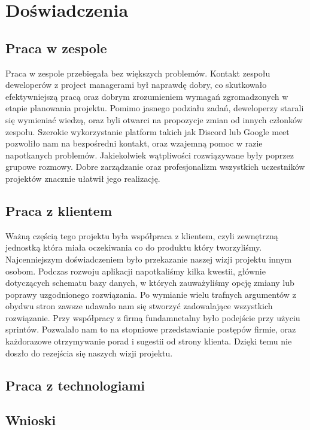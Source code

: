 \chapter{Doświadczenia}

\section{Praca w zespole}

Praca w zespole przebiegała bez większych problemów. Kontakt zespołu deweloperów z project managerami był naprawdę dobry, 
co skutkowało efektywniejszą pracą oraz dobrym zrozumieniem wymagań zgromadzonych w etapie planowania projektu. Pomimo jasnego
podziału zadań, deweloperzy starali się wymieniać wiedzą, oraz byli otwarci na propozycje zmian od innych członków 
zespołu. Szerokie wykorzystanie platform takich jak Discord lub Google meet pozwoliło nam na bezpośredni kontakt, 
oraz wzajemną pomoc w razie napotkanych problemów. Jakiekolwiek wątpliwości rozwiązywane były poprzez grupowe rozmowy.
Dobre zarządzanie oraz profesjonalizm wszystkich uczestników projektów znacznie ułatwił jego realizację.

\section{Praca z klientem}

Ważną częścią tego projektu była współpraca z klientem, czyli zewnętrzną jednostką która miała oczekiwania co do produktu który 
tworzyliśmy. Najcenniejszym doświadczeniem było przekazanie naszej wizji projektu innym osobom. Podczas rozwoju aplikacji napotkaliśmy
kilka kwestii, głównie dotyczących schematu bazy danych, w których zauważyliśmy opcję zmiany lub poprawy uzgodnionego rozwiązania. 
Po wymianie wielu trafnych argumentów z obydwu stron zawsze udawało nam się stworzyć zadowalające wszystkich rozwiązanie. Przy współpracy
z firmą fundamnetalny było podejście przy użyciu sprintów. Pozwalało nam to na stopniowe przedstawianie postępów firmie, oraz każdorazowe
otrzymywanie porad i sugestii od strony klienta. Dzięki temu nie doszło do rezejścia się naszych wizji projektu. 

\section{Praca z technologiami}

\section{Wnioski}